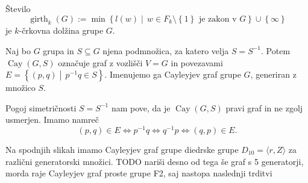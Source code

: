 \documentclass[mat1, tisk]{fmfdelo}
\numberwithin{equation}{section}  %
\begin{document}
\begin{definicija}\label{def_ozina}
Število \begin{equation*}
\operatorname{girth}_{k}(G) := \min \left\{ l(w)  \middle|\,  w \in F_k \setminus \left\{ 1\right\} \text{ je zakon v } G  \right\} \cup \left\{ \infty\right\} 
\end{equation*}  
je $k$-črkovna dolžina grupe $G$.  
\end{definicija}


\begin{definicija}
\label{def_cayleyev_graf}
Naj bo $G$ grupa in $S \subseteq G$ njena podmnožica, za katero velja $S = S^{-1}$. Potem $\operatorname{Cay}(G, S)$ označuje graf z vozlišči $V = G$ in povezavami
$E = \left\{ (p, q) \middle|\, p^{-1}q \in  S \right\}$. Imenujemo ga Cayleyjev graf grupe $G$, generiran z množico $S$.  
\end{definicija}

\begin{opomba}
Pogoj simetričnosti $S = S^{-1}$ nam pove, da je $\operatorname{Cay}(G, S)$ pravi graf in ne zgolj usmerjen. Imamo namreč \begin{equation*}
(p,q) \in  E \iff p^{-1}q \iff q^{-1}p \iff (q,p) \in  E.
\end{equation*}  
\end{opomba}

\begin{primer}
Na spodnjih slikah imamo Cayleyjev graf grupe diedrske grupe $D_{10} = \langle r, Z \rangle$ za različni generatorski množici.
TODO nariši desno od tega še graf s 5 generatorji, morda raje Cayleyjev graf proste grupe F2, saj nastopa naslednji trditvi
\begin{center}
    \end{center}
\end{primer}
\end{document}
